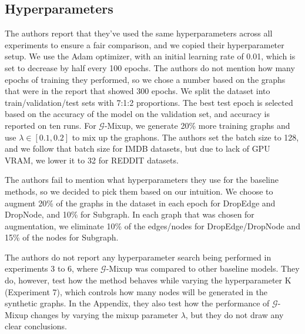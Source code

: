 \subsection{Hyperparameters}

The authors report that they've used the same hyperparameters across all experiments to ensure a fair comparison, and we copied their hyperparameter setup. We use the Adam optimizer, with an initial learning rate of 0.01, which is set to decrease by half every 100 epochs. The authors do not mention how many epochs of training they performed, so we chose a number based on the graphs that were in the report that showed 300 epochs. We split the dataset into train/validation/test sets with 7:1:2 proportions. The best test epoch is selected based on the accuracy of the model on the validation set, and accuracy is reported on ten runs. For $\mathcal{G}$-Mixup, we generate 20\% more training graphs and use $\lambda \in [0.1, 0.2]$ to mix up the graphons. The authors set the batch size to 128, and we follow that batch size for IMDB datasets, but due to lack of GPU VRAM, we lower it to 32 for REDDIT datasets.

The authors fail to mention what hyperparameters they use for the baseline methods, so we decided to pick them based on our intuition. We choose to augment 20\% of the graphs in the dataset in each epoch for DropEdge and DropNode, and 10\% for Subgraph. In each graph that was chosen for augmentation, we eliminate 10\% of the edges/nodes for DropEdge/DropNode and 15\% of the nodes for Subgraph. 

The authors do not report any hyperparameter search being performed in experiments 3 to 6, where $\mathcal{G}$-Mixup was compared to other baseline models. They do, however, test how the method behaves while varying the hyperparameter K (Experiment 7), which controls how many nodes will be generated in the synthetic graphs. In the Appendix, they also test how the performance of $\mathcal{G}$-Mixup changes by varying the mixup parameter $\lambda$, but they do not draw any clear conclusions. 

